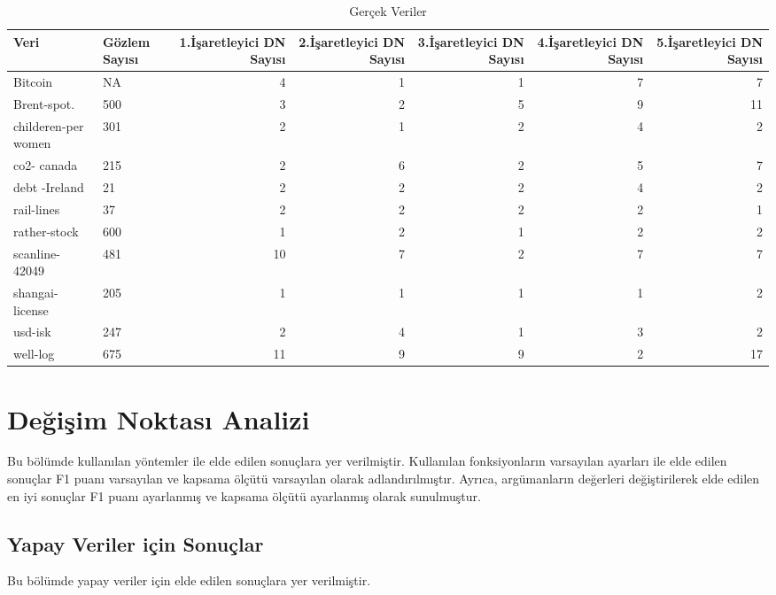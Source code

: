 \documentclass[12pt,twoside]{deuthesis}
\begin{document}
\begin{table}[!h]
\centering\centering
\caption{\label{tab:ngercek}Gerçek Veriler}
\centering
\fontsize{6}{8}\selectfont
\begin{tabular}[t]{llrrrrr}
\toprule
Veri & Gözlem Sayısı & 1.İşaretleyici DN Sayısı & 2.İşaretleyici DN Sayısı & 3.İşaretleyici DN Sayısı & 4.İşaretleyici DN Sayısı & 5.İşaretleyici DN Sayısı\\
\midrule
Bitcoin & NA & 4 & 1 & 1 & 7 & 7\\
Brent-spot. & 500 & 3 & 2 & 5 & 9 & 11\\
childeren-per women & 301 & 2 & 1 & 2 & 4 & 2\\
co2- canada & 215 & 2 & 6 & 2 & 5 & 7\\
debt -Ireland & 21 & 2 & 2 & 2 & 4 & 2\\
\addlinespace
rail-lines & 37 & 2 & 2 & 2 & 2 & 1\\
rather-stock & 600 & 1 & 2 & 1 & 2 & 2\\
scanline-42049 & 481 & 10 & 7 & 2 & 7 & 7\\
shangai-license & 205 & 1 & 1 & 1 & 1 & 2\\
usd-isk & 247 & 2 & 4 & 1 & 3 & 2\\
\addlinespace
well-log & 675 & 11 & 9 & 9 & 2 & 17\\
\bottomrule
\end{tabular}
\end{table}

\section{Değişim Noktası Analizi}\label{deux11fiux15fim-noktasux131-analizi}

Bu bölümde kullanılan yöntemler ile elde edilen sonuçlara yer verilmiştir. Kullanılan fonksiyonların varsayılan ayarları ile elde edilen sonuçlar F1 puanı varsayılan ve kapsama ölçütü varsayılan olarak adlandırılmıştır. Ayrıca, argümanların değerleri değiştirilerek elde edilen en iyi sonuçlar F1 puanı ayarlanmış ve kapsama ölçütü ayarlanmış olarak sunulmuştur.

\subsection{Yapay Veriler için Sonuçlar}\label{yapay-veriler-iuxe7in-sonuuxe7lar}

Bu bölümde yapay veriler için elde edilen sonuçlara yer verilmiştir.
\end{document}
